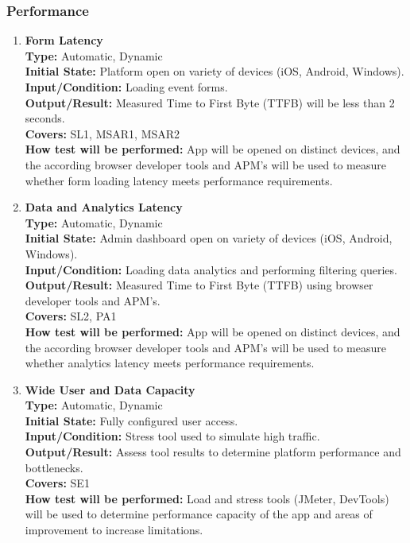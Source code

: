 \documentclass[12pt, titlepage]{article}
\begin{document}
\subsubsection{Performance}
\begin{enumerate}[label=\bfseries PF-\arabic*:, wide=0pt]
  \item \label{test-PF1} \textbf{Form Latency}\\[2mm]
    {\bf Type:} Automatic, Dynamic\\
    {\bf Initial State:} Platform open on variety of devices (iOS, Android, Windows).\\
    {\bf Input/Condition:} Loading event forms.\\
    {\bf Output/Result:} Measured Time to First Byte (TTFB) will be less than 2 seconds.\\
    {\bf Covers:} SL1, MSAR1, MSAR2\\
    {\bf How test will be performed:} App will be opened on distinct devices, and the according browser developer tools and APM's will be used to measure whether form loading latency meets performance requirements.

  \item \label{test-PF2} \textbf{Data and Analytics Latency}\\[2mm]
    {\bf Type:} Automatic, Dynamic\\
    {\bf Initial State:} Admin dashboard open on variety of devices (iOS, Android, Windows).\\
    {\bf Input/Condition:} Loading data analytics and performing filtering queries.\\
    {\bf Output/Result:} Measured Time to First Byte (TTFB) using browser developer tools and APM's.\\
    {\bf Covers:} SL2, PA1\\
    {\bf How test will be performed:} App will be opened on distinct devices, and the according browser developer tools and APM's will be used to measure whether analytics latency meets performance requirements.

  \item \label{test-PF4} \textbf{Wide User and Data Capacity}\\[2mm]
    {\bf Type:} Automatic, Dynamic\\
    {\bf Initial State:} Fully configured user access.\\
    {\bf Input/Condition:} Stress tool used to simulate high traffic.\\
    {\bf Output/Result:} Assess tool results to determine platform performance and bottlenecks.\\
    {\bf Covers:} SE1\\
    {\bf How test will be performed:} Load and stress tools (JMeter, DevTools) will be used to determine performance capacity of the app and areas of improvement to increase limitations.

\end{enumerate}
\end{document}
